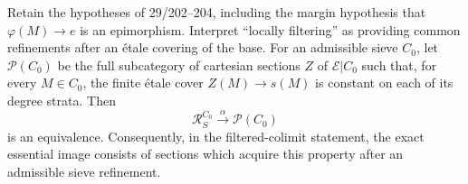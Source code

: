 \begin{proposition}\label{D:alpha-image}
Retain the hypotheses of 29/202--204, including the margin hypothesis
that $\varphi(M)\to e$ is an epimorphism. Interpret ``locally filtering''
as providing common refinements after an \'etale covering of the base.
For an admissible sieve $C_0$, let $\mathcal P(C_0)$ be the full
subcategory of cartesian sections $Z$ of $\mathcal E|C_0$ such that,
for every $M\in C_0$, the finite \'etale cover $Z(M)\to s(M)$ is
constant on each of its degree strata. Then
\[
 \mathscr R_S^{C_0}\xrightarrow{\ \alpha\ }\mathcal P(C_0)
\]
is an equivalence. Consequently, in the filtered-colimit statement,
the exact essential image consists of sections which acquire this
property after an admissible sieve refinement.
\end{proposition}
